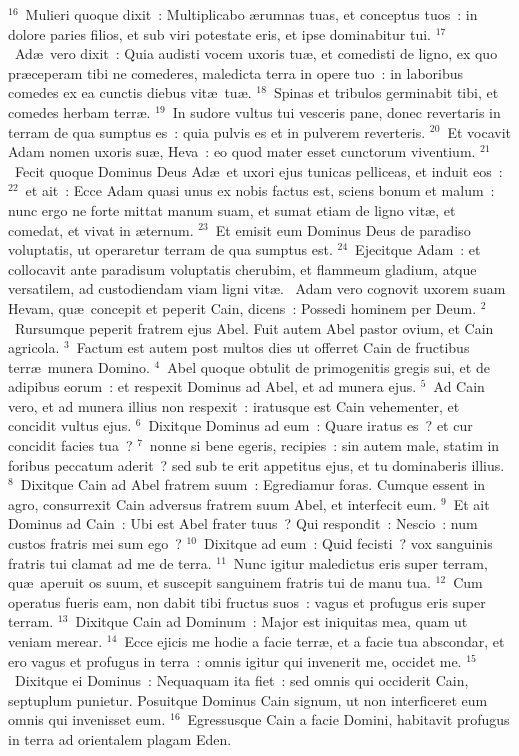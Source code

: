 ${}^{16}$~Mulieri quoque dixit~: Multiplicabo \ae rumnas tuas, et conceptus tuos~: in dolore paries filios, et sub viri potestate eris, et ipse dominabitur tui.
${}^{17}$~Ad\ae\ vero dixit~: Quia audisti vocem uxoris tu\ae , et comedisti de ligno, ex quo pr\ae ceperam tibi ne comederes, maledicta terra in opere tuo~: in laboribus comedes ex ea cunctis diebus vit\ae\ tu\ae .
${}^{18}$~Spinas et tribulos germinabit tibi, et comedes herbam terr\ae .
${}^{19}$~In sudore vultus tui vesceris pane, donec revertaris in terram de qua sumptus es~: quia pulvis es et in pulverem reverteris.
${}^{20}$~Et vocavit Adam nomen uxoris su\ae , Heva~: eo quod mater esset cunctorum viventium.
${}^{21}$~Fecit quoque Dominus Deus Ad\ae\ et uxori ejus tunicas pelliceas, et induit eos~:
${}^{22}$~et ait~: Ecce Adam quasi unus ex nobis factus est, sciens bonum et malum~: nunc ergo ne forte mittat manum suam, et sumat etiam de ligno vit\ae , et comedat, et vivat in \ae ternum.
${}^{23}$~Et emisit eum Dominus Deus de paradiso voluptatis, ut operaretur terram de qua sumptus est.
${}^{24}$~Ejecitque Adam~: et collocavit ante paradisum voluptatis cherubim, et flammeum gladium, atque versatilem, ad custodiendam viam ligni vit\ae .
~Adam vero cognovit uxorem suam Hevam, qu\ae\ concepit et peperit Cain, dicens~: Possedi hominem per Deum.
${}^{2}$~Rursumque peperit fratrem ejus Abel. Fuit autem Abel pastor ovium, et Cain agricola.
${}^{3}$~Factum est autem post multos dies ut offerret Cain de fructibus terr\ae\ munera Domino.
${}^{4}$~Abel quoque obtulit de primogenitis gregis sui, et de adipibus eorum~: et respexit Dominus ad Abel, et ad munera ejus.
${}^{5}$~Ad Cain vero, et ad munera illius non respexit~: iratusque est Cain vehementer, et concidit vultus ejus.
${}^{6}$~Dixitque Dominus ad eum~: Quare iratus es~? et cur concidit facies tua~?
${}^{7}$~nonne si bene egeris, recipies~: sin autem male, statim in foribus peccatum aderit~? sed sub te erit appetitus ejus, et tu dominaberis illius.
${}^{8}$~Dixitque Cain ad Abel fratrem suum~: Egrediamur foras. Cumque essent in agro, consurrexit Cain adversus fratrem suum Abel, et interfecit eum.
${}^{9}$~Et ait Dominus ad Cain~: Ubi est Abel frater tuus~? Qui respondit~: Nescio~: num custos fratris mei sum ego~?
${}^{10}$~Dixitque ad eum~: Quid fecisti~? vox sanguinis fratris tui clamat ad me de terra.
${}^{11}$~Nunc igitur maledictus eris super terram, qu\ae\ aperuit os suum, et suscepit sanguinem fratris tui de manu tua.
${}^{12}$~Cum operatus fueris eam, non dabit tibi fructus suos~: vagus et profugus eris super terram.
${}^{13}$~Dixitque Cain ad Dominum~: Major est iniquitas mea, quam ut veniam merear.
${}^{14}$~Ecce ejicis me hodie a facie terr\ae , et a facie tua abscondar, et ero vagus et profugus in terra~: omnis igitur qui invenerit me, occidet me.
${}^{15}$~Dixitque ei Dominus~: Nequaquam ita fiet~: sed omnis qui occiderit Cain, septuplum punietur. Posuitque Dominus Cain signum, ut non interficeret eum omnis qui invenisset eum.
${}^{16}$~Egressusque Cain a facie Domini, habitavit profugus in terra ad orientalem plagam Eden.


